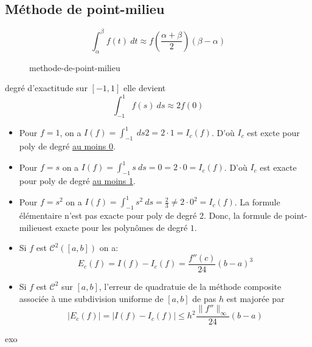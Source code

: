 \subsection{Méthode de point-milieu}
\begin{definition}
    \[
    \int_{{\alpha}}^{{\beta}} {f(t)} \: d{t} \approx f(\frac{\alpha + \beta}{2})(\beta - \alpha)
    \] 
\begin{figure}[H]
    \centering
    \caption{methode-de-point-milieu}
    \label{fig:methode-de-point-milieu}
\end{figure}
\end{definition}
\begin{eg} degré d'exactitude sur $[-1, 1]$ elle devient
     \[
    \int_{{-1}}^{{1}} {f(s)} \: d{s} \approx 2f(0)
    \] 
    \begin{itemize}
        \item Pour $f = 1$, on a  $I(f) = \int_{{-1}}^{{1}} {} \: d{s} 2 = 2 \cdot 1 = I_c(f)$. D'où $I_c$ est excte pour poly de degré \underline{au moins 0}.
        \item Pour  $f = s$ on a  $I(f) = \int_{{-1}}^{{1}} {s} \: d{s} = 0 = 2 \cdot 0 = I_c(f)$. D'où $I_c$ est exacte pour poly de degré \underline{au moins 1}.
        \item  Pour  $f = s^2$ on a  $I(f) = \int_{{-1}}^{{1}} {s^2} \: d{s} = \frac{2}{3} \neq  2 \cdot 0^2 = I_c(f)$. La formule élémentaire n'est pas exacte pour poly de degré 2. Donc, la formule de point-milieuest exacte pour les polynômes de degré $1$.
    \end{itemize}
\end{eg}
\begin{prop}
    \begin{itemize}
        \item Si $f$ est  $\mathcal{C}^2([a, b])$ on a:
             \[
            E_c(f) = I(f) - I_c(f) = \frac{f''(c)}{24}(b - a)^3
            \] 
        \item Si $f$ est  $\mathcal{C}^2$ sur  $[a, b]$, l'erreur de quadratuie de la méthode composite associée à une subdivision uniforme de  $[a, b]$ de pas  $h$ est majorée par
             \[
            \left| E_c(f) \right| = \left| I(f) - I_c(f) \right| \le h^2 \frac{\|f''\|_{\infty}}{24}(b - a)
            \] 
    \end{itemize}
\end{prop}
\begin{preuve}
   exo 
\end{preuve}

